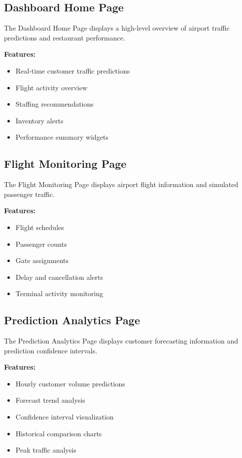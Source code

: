 \documentclass[12pt]{article}
\begin{document}
\subsection{Dashboard Home Page}
The Dashboard Home Page displays a high-level overview of airport traffic predictions and restaurant performance.

\textbf{Features:}
\begin{itemize}
\item Real-time customer traffic predictions
\item Flight activity overview
\item Staffing recommendations
\item Inventory alerts
\item Performance summary widgets
\end{itemize}

\subsection{Flight Monitoring Page}
The Flight Monitoring Page displays airport flight information and simulated passenger traffic.

\textbf{Features:}
\begin{itemize}
\item Flight schedules
\item Passenger counts
\item Gate assignments
\item Delay and cancellation alerts
\item Terminal activity monitoring
\end{itemize}

\subsection{Prediction Analytics Page}
The Prediction Analytics Page displays customer forecasting information and prediction confidence intervals.

\textbf{Features:}
\begin{itemize}
\item Hourly customer volume predictions
\item Forecast trend analysis
\item Confidence interval visualization
\item Historical comparison charts
\item Peak traffic analysis
\end{itemize}
\end{document}
